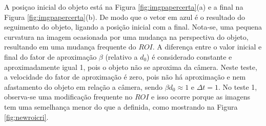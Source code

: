 A posiçao inicial do objeto está na Figura \ref{fig:imgpapercerta}(a) 
e a final na Figura \ref{fig:imgpapercerta}(b). De modo que o
vetor em azul é o resultado do seguimento do objeto, ligando a posição inicial com a final.
Nota-se, uma pequena curvatura na imagem ocasionada por uma mudança
na perspectiva do objeto, resultando em uma mudança frequente do $ROI$.
A diferença entre o valor inicial e final do fator de aproximação $\beta$ (relativo a $d_0$) é considerado constante
e aproximadamente igual 1, pois o objeto não se aproxima da câmera.
Neste teste, a velocidade do fator de aproximação é zero, pois não há aproximação e nem
afastamento do objeto em relação a câmera, sendo $\beta d_0 \approx 1$ e $\Delta t=1$.
No teste 1, observa-se uma modificação frequente no $ROI$ e isso ocorre porque as imagens 
tem uma semelhança menor do que a definida, como mostrando na Figura \ref{fig:newroicri}.
